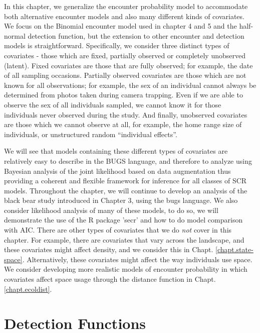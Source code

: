 In this chapter, we  generalize the encounter probability
model to accommodate both alternative encounter models and also 
many different kinds of covariates. We focus on the Binomial encounter
model used in chapter 4 and 5 and the half-normal detection function,
but the extension to other encounter and detection models is
straightforward.  Specifically, we consider three distinct types of
covariates - those which are fixed, partially observed or completely
unobserved (latent).  Fixed covariates are those that are fully
observed; for example, the date of all sampling occasions.  Partially
observed covariates are those which are not known for all
observations; for example, the sex of an individual cannot always be
determined from photos taken during camera trapping.  Even if we are
able to observe the sex of all individuals sampled, we cannot know it
for those individuals never observed during the study.  And finally,
unobserved covariates are those which we cannot observe at all, for
example, the home range size of individuals, or unstructured random
``individual effects''.


We will see that models containing these different types of
covariates are relatively easy to describe in the BUGS language, and
therefore to analyze using Bayesian analysis of the joint likelihood
based on data augmentation thus providing a coherent and flexible
framework for inference for all classes of SCR models.  Throughout the
chapter, we will continue to develop an analysis of the black bear
study introduced in Chapter 3, using the bugs language.  We also
consider likelihood analysis of many of these models, to do so, we
will demonstrate the use of the R package 'secr' and how to do model
comparison with AIC.
There are other types of covariates that we do {\it not} cover in this
chapter. For example, there are covariates that vary across the 
landscape, and these covariates 
might affect density, and we consider this in
Chapt. \ref{chapt.state-space}.
Alternatively, these covariates might affect the way individuals use
space. We consider developing more realistic models of encounter
probability in which covariates affect space usage through  the distance
function in Chapt. \ref{chapt.ecoldist}.


\section{Detection Functions}


